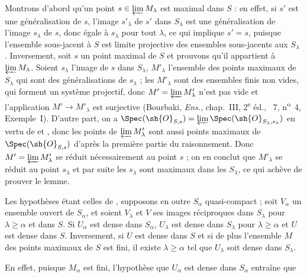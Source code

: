 Montrons d'abord qu'un point $s\in\varprojlim M_\lambda$ est maximal dans $S$ : en effet, si $s'$ est une généralisation de $s$, l'image $s'_\lambda$ de $s'$ dans $S_\lambda$ est une généralisation de l'image $s_\lambda$ de $s$, donc égale à $s_\lambda$ pour tout $\lambda$, ce qui implique $s'=s$, puisque l'ensemble sous-jacent à $S$ est limite projective des ensembles sous-jacents aux $S_\lambda$ .
Inversement, soit $s$ un point maximal de $S$ et prouvons qu'il appartient à $\varprojlim M_\lambda$.
Soient $s_\lambda$ l'image de $s$ dans $S_\lambda$, $M'_\lambda$ l'ensemble des points maximaux de $S_\lambda$ qui sont des généralisations de $s_\lambda$ ; les $M'_\lambda$ sont des ensembles finis non vides, qui forment un système projectif, donc $M'=\varprojlim M'_\lambda$ n'est pas vide et l'application $M'\to M'_\lambda$ est surjective (Bourbaki, \emph{Ens.}, chap.~III, 2\textsuperscript{e} éd., \textsection~7, n\textsuperscript{o}~4, Exemple~I).
D'autre part, on a $\Spec(\sh{O}_{S,s})=\varprojlim\Spec(\sh{O}_{S_\lambda,s_\lambda})$ en vertu de  et , donc les points de $\varprojlim M'_\lambda$ sont aussi points maximaux de $\Spec(\sh{O}_{S,s})$ d'après la première partie du raisonnement.
Donc $M'=\varprojlim M'_\lambda$ se réduit nécessairement au point $s$ ; on en conclut que $M'_\lambda$ se réduit au point $s_\lambda$ et par suite les $s_\lambda$ sont maximaux dans les $S_\lambda$, ce qui achève de prouver le lemme.

\begin{lemma}[20.3.8.4]
\label{IV.20.3.8.4}
Les hypothèses étant celles de , supposons en outre $S_\alpha$ quasi-compact ; soit $V_\alpha$ un ensemble ouvert de $S_\alpha$, et soient $V_\lambda$ et $V$ ses images réciproques dans $S_\lambda$ pour $\lambda\geq\alpha$ et dans $S$.
Si $U_\alpha$ est dense dans $S_\alpha$, $U_\lambda$ est dense dans $S_\lambda$ pour $\lambda\geq\alpha$ et $U$ est dense dans $S$.
Inversement, si $U$ est dense dans $S$ et si de plus l'ensemble $M$ des points maximaux de $S$ est fini, il existe $\lambda\geq\alpha$ tel que $U_\lambda$ soit dense dans $S_\lambda$.
\end{lemma}

En effet, puisque $M_\alpha$ est fini, l'hypothèse que $U_\alpha$ est dense dans $S_\alpha$ entraîne que
